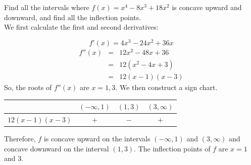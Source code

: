 \documentclass{book}
\begin{document}
\begin{Exam} Find all the intervals where $f(x) = x^4 - 8x^3 + 18x^2$ is concave upward and downward, and find all the inflection points.\\

We first calculate the first and second derivatives:

\[f'(x) = 4x^3 - 24x^2 + 36x\]
\begin{eqnarray*}
f''(x) &=& 12x^2 - 48x + 36\\
&=& 12(x^2-4x + 3)\\
&=& 12(x-1)(x-3)
\end{eqnarray*} So, the roots of $f''(x)$ are $x=1, 3$. We then construct a sign chart.\\

\begin{center}
\begin{tabular}{c|c|c|c}
 & $(-\infty, 1)$ & $(1, 3)$ & $(3, \infty)$ \\ \hline
$12(x-1)(x-3)$ & $+$ & $-$ & $+$ \\ %
\end{tabular}
\end{center}\vs Therefore, $f$ is concave upward on the intervals $(-\infty, 1)$ and $(3,\infty)$ and concave downward on the interval $(1,3)$. The inflection points of $f$ are $x=1$ and $3$. 
\end{Exam}

\vfill
{}
\pagebreak
\end{document}
